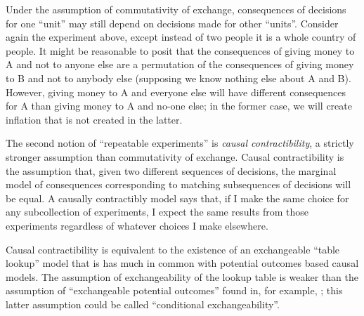 Under the assumption of commutativity of exchange, consequences of decisions for one ``unit'' may still depend on decisions made for other ``units''. Consider again the experiment above, except instead of two people it is a whole country of people. It might be reasonable to posit that the consequences of giving money to A and not to anyone else are a permutation of the consequences of giving money to B and not to anybody else (supposing we know nothing else about A and B). However, giving money to A and everyone else will have different consequences for A than giving money to A and no-one else; in the former case, we will create inflation that is not created in the latter.

The second notion of ``repeatable experiments'' is \emph{causal contractibility}, a strictly stronger assumption than commutativity of exchange. Causal contractibility is the assumption that, given two different sequences of decisions, the marginal model of consequences corresponding to matching subsequences of decisions will be equal. A causally contractibly model says that, if I make the same choice for any subcollection of experiments, I expect the same results from those experiments regardless of whatever choices I make elsewhere.

Causal contractibility is equivalent to the existence of an exchangeable ``table lookup'' model that is has much in common with potential outcomes based causal models. The assumption of exchangeability of the lookup table is weaker than the assumption of ``exchangeable potential outcomes'' found in, for example, \citet{greenland_identifiability_1986}; this latter assumption could be called ``conditional exchangeability''.





